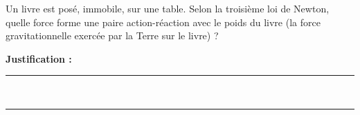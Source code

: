 Un livre est posé, immobile, sur une table. Selon la troisième loi de Newton, quelle force forme une paire action-réaction avec le poids du livre (la force gravitationnelle exercée par la Terre sur le livre) ?

\choices

\noindent\textbf{Justification :} \hrulefill \\[2.5ex]
\rule{\linewidth}{0.4pt} \\[2.5ex]
\rule{\linewidth}{0.4pt}
\vfill

